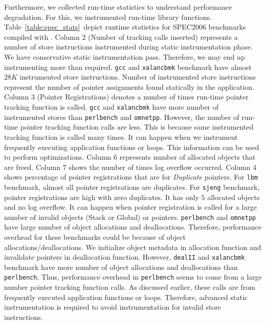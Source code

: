 Furthermore, we collected run-time statistics to understand performance degradation. For this, we instrumented \projectname{} run-time library functions. Table~\ref{table:spec_stats}\ depict runtime statistics for SPEC2006 benchmarks compiled with \projectname{}. Column $2$ (Number of tracking calls inserted) represents a number of store instructions instrumented during static instrumentation phase. We have conservative static instrumentation pass. Therefore, we may end up instrumenting more than required. \texttt{gcc} and \texttt{xalancbmk} benchmark have almost $28K$ instrumented store instructions. Number of instrumented store instructions represent the number of pointer assignments found statically in the application. Column $3$ (Pointer Registrations) denotes a number of times run-time pointer tracking function is called. \texttt{gcc} and \texttt{xalancbmk} have more number of instrumented stores than \texttt{perlbench} and \texttt{omnetpp}. However, the number of run-time pointer tracking function calls are less. This is because same instrumented tracking function is called many times. It can happen when we instrument frequently executing application functions or loops. This information can be used to perform \projectname{} optimizations. Column $6$ represents number of allocated objects that are freed. Column $7$ shows the number of times log overflow occurred. Column $4$ shows percentage of  pointer registrations that are for \textit{Duplicate} pointers. For \texttt{lbm} benchmark, almost all pointer registrations are duplicates. For \texttt{sjeng} benchmark, pointer registrations are high with zero duplicates. It has only $5$ allocated objects and no log overflow. It can happen when pointer registration is called for a large number of invalid objects (Stack or Global) or pointers. \texttt{perlbench} and \texttt{omnetpp} have large number of object allocations and deallocations. Therefore, performance overhead for these benchmarks could be because of object allocations/deallocations. We initialize object metadata in allocation function and invalidate pointers in deallocation function. However, \texttt{dealII} and \texttt{xalancbmk} benchmark have more number of object allocations and deallocations than \texttt{perlbench}. Thus, performance overhead in \texttt{perlbench} seems to come from a large number pointer tracking function calls. As discussed earlier, these calls are from frequently executed application functions or loops. Therefore, advanced static instrumentation is required to avoid instrumentation for invalid store instructions. \\

